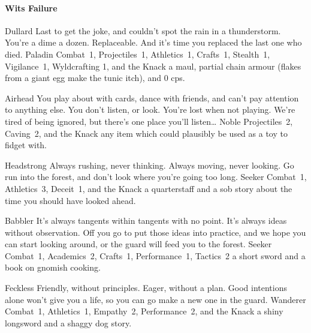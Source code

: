 \begin{multicols}{2}
\begin{itemize}
\end{itemize}

\paragraph{Wits Failure}
\begin{itemize}

  {Dullard}%
  {%
    Last to get the joke, and couldn't spot the rain in a thunderstorm.
    You're a dime a dozen.
    Replaceable.
    And it's time you replaced the last one who died.
  }%
  {Paladin}%
  {Combat~1, Projectiles~1, Athletics~1, Crafts~1, Stealth~1, Vigilance~1, Wyldcrafting 1, and the Knack \lucky}%
  {a maul, partial chain armour (flakes from a giant egg make the tunic itch), and 0 \glspl{cp}.}%

  {Airhead}%
  {You play about with cards, dance with friends, and can't pay attention to anything else.
  You don't listen, or look.
  You're lost when not playing.
  We're tired of being ignored, but there's one place you'll listen\ldots
  }%
  {Noble}%
  {Projectiles~2, Caving~2, and the Knack \unstoppable}%
  {any item which could plausibly be used as a toy to fidget with.}%

  {Headstrong}%
  {Always rushing, never thinking.
  Always moving, never looking.
  Go run into the forest, and don't look where you're going too long.
  }%
  {Seeker}%
  {Combat~1, Athletics~3, Deceit~1, and the Knack \charge}%
  {a quarterstaff and a sob story about the time you should have looked ahead.}%

  {Babbler}%
  {It's always tangents within tangents with no point.
  It's always ideas without observation.
  Off you go to put those ideas into practice, and we hope you can start looking around, or the \gls{guard} will feed you to the forest.
  }%
  {Seeker}%
  {Combat~1, Academics~2, Crafts~1, Performance~1, Tactics~2}%
  {a short sword and a book on gnomish cooking.}%

  {Feckless}%
  {Friendly, without principles.
  Eager, without a plan.
  Good intentions alone won't give you a life, so you can go make a new one in the \gls{guard}.
  }%
  {Wanderer}%
  {Combat~1, Athletics~1, Empathy~2, Performance~2, and the Knack \fasthealer}%
  {a shiny longsword and a shaggy dog story.}%


\end{itemize}
\end{multicols}
